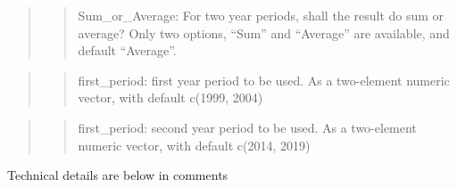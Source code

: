 \documentclass[
]{article}
\begin{document}
\begin{quote}
\begin{quote}
Sum\_or\_Average: For two year periods, shall the result do sum or
average? Only two options, ``Sum'' and ``Average'' are available, and
default ``Average''.
\end{quote}
\end{quote}

\begin{quote}
\begin{quote}
first\_period: first year period to be used. As a two-element numeric
vector, with default c(1999, 2004)
\end{quote}
\end{quote}

\begin{quote}
\begin{quote}
first\_period: second year period to be used. As a two-element numeric
vector, with default c(2014, 2019)
\end{quote}
\end{quote}

Technical details are below in comments
\end{document}
